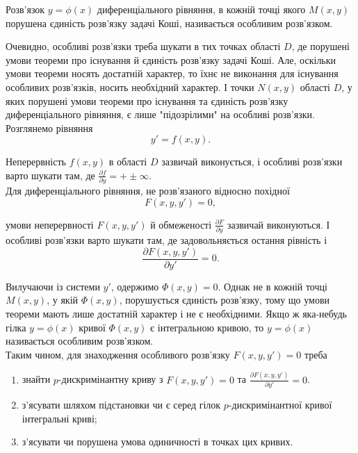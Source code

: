 \begin{definition}
	Розв'язок $y = \phi(x)$ диференціального рівняння, в кожній точці якого $M(x,y)$ порушена єдиність розв'язку задачі Коші, називається особливим розв'язком. 
\end{definition}

Очевидно, особливі розв'язки треба шукати в тих точках області $D$, де порушені умови теореми про існування й єдиність розв'язку задачі Коші. Але, оскільки умови теореми носять достатній характер, то їхнє не виконання для існування особливих розв'язків, носить необхідний характер. І точки $N(x,y)$ області $D$, у яких порушені умови теореми про існування та єдиність розв'язку диференціального рівняння, є лише "підозрілими" на особливі розв'язки. \\

Розглянемо рівняння 
\begin{equation*}
	y' = f(x,y).
\end{equation*}

Неперервність $f(x,y)$ в області $D$ зазвичай виконується, і особливі роз\-в'яз\-ки варто шукати там, де $\frac{\partial f}{\partial y} = +\pm \infty$. \\

Для диференціального рівняння, не роз\-в'яз\-а\-но\-го відносно похідної 
\begin{equation*}
	F(x, y, y') = 0,
\end{equation*}

умови неперервності $F(x,y,y')$ й обмеженості $\frac{\partial F}{\partial y}$ зазвичай виконуються. І особливі розв'язки варто шукати там, де задовольняється остання рівність і 
\begin{equation*}
	\frac{\partial F(x,y,y')}{\partial y'} = 0.
\end{equation*}

Вилучаючи із системи $y'$, одержимо $\Phi(x,y)=0$. Однак не в кожній точці $M(x,y)$, у якій $\Phi(x,y)$, порушується єдиність роз\-в'яз\-ку, тому що умови теореми мають лише достатній характер і не є необхідними. Якщо ж яка-небудь гілка $y=\phi(x)$ кривої $\Phi(x,y)$ є інтегральною кривою, то $y=\phi(x)$ називається особливим роз\-в'яз\-ком. \\

Таким чином, для знаходження особливого роз\-в'яз\-ку $F(x, y, y') = 0$ треба
\begin{enumerate}
	\item знайти $p$-дискримінантну криву з $F(x, y, y') = 0$ та $\frac{\partial F(x,y,y')}{\partial y'} = 0$.
	\item з'я\-су\-ва\-ти шляхом підстановки чи є серед гілок $p$-дискримінантної кривої інтегральні криві;
	\item з'я\-су\-ва\-ти чи порушена умова одиничності в точках цих кривих.
\end{enumerate}
